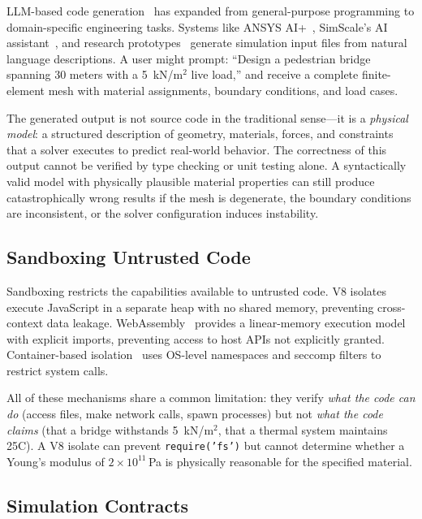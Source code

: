 \documentclass[letterpaper,twocolumn,10pt]{article}
\begin{document}
LLM-based code generation~\cite{chen2021codex,li2023codegeneration}
has expanded from general-purpose programming to domain-specific
engineering tasks. Systems like ANSYS AI+~\cite{ansys2025ai},
SimScale's AI assistant~\cite{simscale2025}, and research
prototypes~\cite{buehler2024mechgpt} generate simulation input files
from natural language descriptions. A user might prompt: ``Design a
pedestrian bridge spanning 30 meters with a 5~kN/m$^2$ live load,''
and receive a complete finite-element mesh with material assignments,
boundary conditions, and load cases.

The generated output is not source code in the traditional sense---it is
a \emph{physical model}: a structured description of geometry, materials,
forces, and constraints that a solver executes to predict real-world
behavior. The correctness of this output cannot be verified by type
checking or unit testing alone. A syntactically valid model with
physically plausible material properties can still produce catastrophically
wrong results if the mesh is degenerate, the boundary conditions are
inconsistent, or the solver configuration induces instability.

\subsection{Sandboxing Untrusted Code}

Sandboxing restricts the capabilities available to untrusted code.
V8 isolates~\cite{nickel2020isolate} execute JavaScript in a separate
heap with no shared memory, preventing cross-context data leakage.
WebAssembly~\cite{haas2017wasm} provides a linear-memory execution model
with explicit imports, preventing access to host APIs not explicitly
granted. Container-based isolation~\cite{merkel2014docker,gvisor2019}
uses OS-level namespaces and seccomp filters to restrict system calls.

All of these mechanisms share a common limitation: they verify
\emph{what the code can do} (access files, make network calls, spawn
processes) but not \emph{what the code claims} (that a bridge
withstands 5~kN/m$^2$, that a thermal system maintains 25\textdegree C).
A V8 isolate can prevent \texttt{require('fs')} but cannot determine
whether a Young's modulus of $2 \times 10^{11}$\,Pa is physically
reasonable for the specified material.

\subsection{Simulation Contracts}
\end{document}
